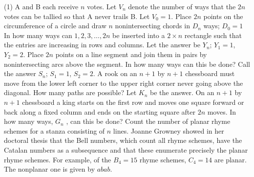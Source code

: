 \documentclass[10pt,]{book}
\theoremstyle{plain}
\theoremstyle{definition}
\theoremstyle{definition}
\numberwithin{equation}{chapter}
\begin{document}
\begin{exercisegroup}(1)
\exercise[13.]\hypertarget{exercise-36}{}\hypertarget{p-91}{}%
A and B each receive \(n\) votes. Let \(V_{n}\) denote the number of ways that the \(2n\) votes can be tallied so that A never trails B. Let \(V_{0} = 1\).%
\exercise[14.]\hypertarget{exercise-37}{}\hypertarget{p-92}{}%
Place \(2n\) points on the circumference of a circle and draw \(n\)  nonintersecting chords in \(D_{n}\) ways; \(D_{0} = 1\)%
\exercise[15.]\hypertarget{exercise-38}{}\hypertarget{p-93}{}%
In how many ways can \(1, 2, 3, \ldots, 2n\) be inserted into a \(2\times n\) rectangle such that the entries are increasing in rows and columns.  Let the answer be \(Y_n\); \(Y_1 = 1\), \(Y_2 = 2\).%
\exercise[16.]\hypertarget{exercise-39}{}\hypertarget{p-94}{}%
Place \(2n\) points on a line segment and join them in pairs by nonintersecting arcs above the segment. In how many ways can this be done? Call the answer \(S_{n}\); \(S_{1}=1\), \(S_{2}=2\).%
\exercise[17.]\hypertarget{exercise-40}{}\hypertarget{p-95}{}%
A rook on an \(n + 1\) by \(n + 1\) chessboard must move from the lower left corner to the upper right corner never going above the diagonal. How many paths are possible? Let \(K_{n}\) be the answer.%
\exercise[18.]\hypertarget{exercise-41}{}\hypertarget{p-96}{}%
On an \(n + 1\) by \(n + 1\) chessboard a king starts on the first row and moves one square forward or back along a fixed column and ends on the starting square after \(2n\) moves. In how many ways, \(G_{n}\) , can this be done?%
\exercise[19.]\hypertarget{exercise-42}{}\hypertarget{p-97}{}%
Count the number of planar rhyme schemes for a stanza consisting of \(n\) lines. Joanne Growney showed in her doctoral thesis that the Bell numbers, which count all rhyme schemes, have the Catalan numbers as a subsequence and that these enumerate precisely the planar rhyme schemes. For example, of the \(B_4 = 15\) rhyme schemes, \(C_4 = 14\) are planar. The nonplanar one is given by \(abab\).%
\end{exercisegroup}
\par\smallskip\noindent
\typeout{************************************************}
\typeout{************************************************}
\end{document}
